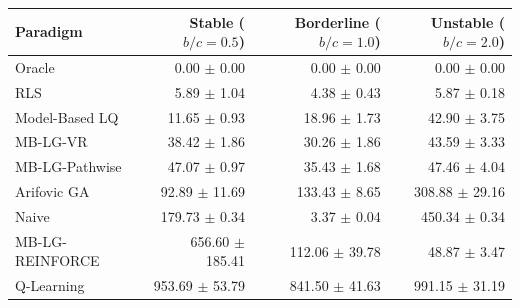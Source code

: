 \begin{tabular}{lrrr}
\toprule
Paradigm & Stable ($b/c=0.5$) & Borderline ($b/c=1.0$) & Unstable ($b/c=2.0$) \\
\midrule
Oracle & 0.00 $\pm$ 0.00 & 0.00 $\pm$ 0.00 & 0.00 $\pm$ 0.00 \\
RLS & 5.89 $\pm$ 1.04 & 4.38 $\pm$ 0.43 & 5.87 $\pm$ 0.18 \\
Model-Based LQ & 11.65 $\pm$ 0.93 & 18.96 $\pm$ 1.73 & 42.90 $\pm$ 3.75 \\
MB-LG-VR & 38.42 $\pm$ 1.86 & 30.26 $\pm$ 1.86 & 43.59 $\pm$ 3.33 \\
MB-LG-Pathwise & 47.07 $\pm$ 0.97 & 35.43 $\pm$ 1.68 & 47.46 $\pm$ 4.04 \\
Arifovic GA & 92.89 $\pm$ 11.69 & 133.43 $\pm$ 8.65 & 308.88 $\pm$ 29.16 \\
Naive & 179.73 $\pm$ 0.34 & 3.37 $\pm$ 0.04 & 450.34 $\pm$ 0.34 \\
MB-LG-REINFORCE & 656.60 $\pm$ 185.41 & 112.06 $\pm$ 39.78 & 48.87 $\pm$ 3.47 \\
Q-Learning & 953.69 $\pm$ 53.79 & 841.50 $\pm$ 41.63 & 991.15 $\pm$ 31.19 \\
\bottomrule
\end{tabular}
